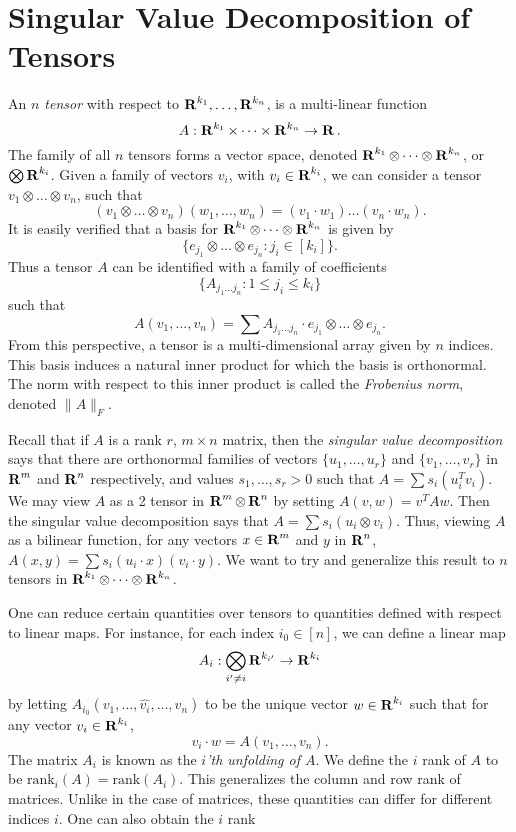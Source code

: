 \section{Singular Value Decomposition of Tensors}

An \emph{$n$ tensor} with respect to $\operatorname{\mathbf{R}}^{k_1}, \dots, \operatorname{\mathbf{R}}^{k_n}$, is a multi-linear function
%
\[ A: \operatorname{\mathbf{R}}^{k_1} \times \dots \times \operatorname{\mathbf{R}}^{k_n} \to \operatorname{\mathbf{R}}. \]
%
The family of all $n$ tensors forms a vector space, denoted $\operatorname{\mathbf{R}}^{k_1} \otimes \dots \otimes \operatorname{\mathbf{R}}^{k_n}$, or $\bigotimes \operatorname{\mathbf{R}}^{k_i}$. Given a family of vectors $v_i$, with $v_i \in \operatorname{\mathbf{R}}^{k_i}$, we can consider a tensor $v_1 \otimes \dots \otimes v_n$, such that
%
\[ (v_1 \otimes \dots \otimes v_n)(w_1, \dots, w_n) = (v_1 \cdot w_1) \dots (v_n \cdot w_n). \]
%
It is easily verified that a basis for $\operatorname{\mathbf{R}}^{k_1} \otimes \dots \otimes \operatorname{\mathbf{R}}^{k_n}$ is given by
%
\[ \{ e_{j_1} \otimes \dots \otimes e_{j_n} : j_i \in [k_i] \}. \]
%
Thus a tensor $A$ can be identified with a family of coefficients
%
\[ \{ A_{j_1 \dots j_n} : 1 \leq j_i \leq k_i \} \]
%
such that
%
\[ A(v_1,\dots,v_n) = \sum A_{j_1 \dots j_n} \cdot e_{j_1} \otimes \dots \otimes e_{j_n}. \]
%
From this perspective, a tensor is a multi-dimensional array given by $n$ indices. This basis induces a natural inner product for which the basis is orthonormal. The norm with respect to this inner product is called the \emph{Frobenius norm}, denoted $\| A \|_F$.

Recall that if $A$ is a rank $r$, $m \times n$ matrix, then the \emph{singular value decomposition} says that there are orthonormal families of vectors $\{ u_1, \dots, u_r \}$ and $\{ v_1, \dots, v_r \}$ in $\operatorname{\mathbf{R}}^m$ and $\operatorname{\mathbf{R}}^n$ respectively, and values $s_1, \dots, s_r > 0$ such that $A = \sum s_i (u_i^T v_i)$. We may view $A$ as a 2 tensor in $\operatorname{\mathbf{R}}^m \otimes \operatorname{\mathbf{R}}^n$ by setting $A(v,w) = v^T A w$. Then the singular value decomposition says that $A = \sum s_i (u_i \otimes v_i)$. Thus, viewing $A$ as a bilinear function, for any vectors $x \in \operatorname{\mathbf{R}}^m$ and $y$ in $\operatorname{\mathbf{R}}^n$, $A(x,y) = \sum s_i (u_i \cdot x) (v_i \cdot y)$. We want to try and generalize this result to $n$ tensors in $\operatorname{\mathbf{R}}^{k_1} \otimes \dots \otimes \operatorname{\mathbf{R}}^{k_n}$.

One can reduce certain quantities over tensors to quantities defined with respect to linear maps. For instance, for each index $i_0 \in [n]$, we can define a linear map
%
\[ A_i: \bigotimes_{i' \neq i} \operatorname{\mathbf{R}}^{k_{i'}} \to \operatorname{\mathbf{R}}^{k_i} \]
%
by letting $A_{i_0}(v_1, \dots, \widehat{v_i}, \dots, v_n)$ to be the unique vector $w \in \operatorname{\mathbf{R}}^{k_i}$ such that for any vector $v_i \in \operatorname{\mathbf{R}}^{k_i}$,
%
\[ v_i \cdot w = A(v_1, \dots, v_n). \]
%
The matrix $A_i$ is known as the \emph{$i$'th unfolding of $A$}. We define the $i$ rank of $A$ to be $\text{rank}_i(A) = \text{rank}(A_i)$. This generalizes the column and row rank of matrices. Unlike in the case of matrices, these quantities can differ for different indices $i$. One can also obtain the $i$ rank

